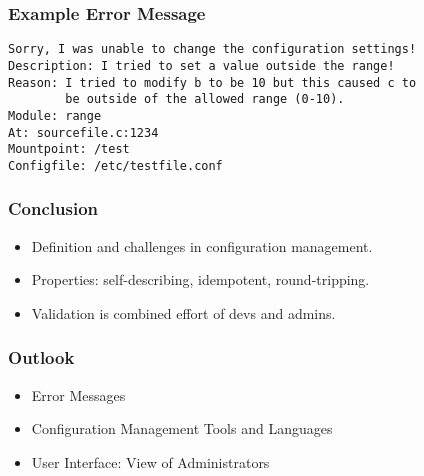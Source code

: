 \begin{frame}[fragile]
	\frametitle{Example Error Message}
\begin{verbatim}
Sorry, I was unable to change the configuration settings!
Description: I tried to set a value outside the range!
Reason: I tried to modify b to be 10 but this caused c to
        be outside of the allowed range (0-10).
Module: range
At: sourcefile.c:1234
Mountpoint: /test
Configfile: /etc/testfile.conf
\end{verbatim}
\end{frame}


\begin{frame}
	\frametitle{Conclusion}

	\begin{itemize}[<+-| alert@+>]
	\item Definition and challenges in configuration management.
	\item Properties: self-describing, idempotent, round-tripping.
	\item Validation is combined effort of devs and admins.
	\end{itemize}
\end{frame}


\begin{frame}
	\frametitle{Outlook}

	\begin{itemize}[<+-| alert@+>]
	\item Error Messages
	\item Configuration Management Tools and Languages
	\item User Interface: View of Administrators
	\end{itemize}
\end{frame}




\nocite{raab2017introducing}

\appendix

\begin{frame}[allowframebreaks]
	
	
\end{frame}



